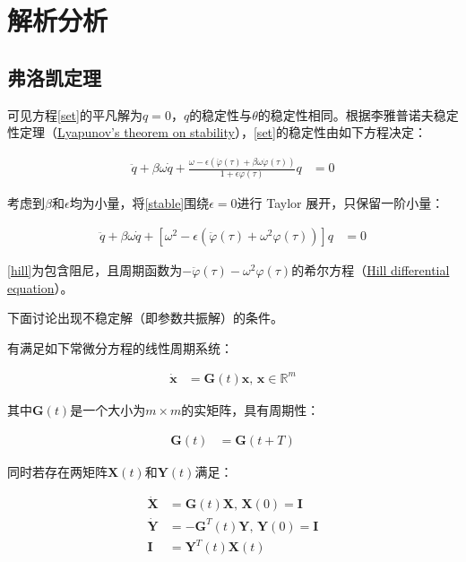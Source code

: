\section{解析分析}

\subsection{弗洛凯定理}

可见方程\eqref{set}的平凡解为$q=0$，$q$的稳定性与$\theta$的稳定性相同。根据李雅普诺夫稳定性定理（\href{https://en.wikipedia.org/wiki/Lyapunov_stability}{Lyapunov's theorem on stability}）\cite{belyakov_nonlinear_2009}，\eqref{set}的稳定性由如下方程决定：

\begin{align}
    \ddot{q}+\beta\omega\dot{q}+\frac{\omega-\epsilon(\ddot{\varphi}(\tau)+\beta\omega\dot{\varphi}(\tau))}{1+\epsilon\varphi(\tau)}q &= 0 \label{stable}
\end{align}

考虑到$\beta$和$\epsilon$均为小量，将\eqref{stable}围绕$\epsilon=0$进行 Taylor 展开，只保留一阶小量：

\begin{align}
    \ddot{q}+\beta\omega\dot{q}+\left[\omega^{2}-\epsilon\left(\ddot{\varphi}(\tau)+\omega^{2}\varphi(\tau)\right)\right]q &=0 \label{hill}
\end{align}

\eqref{hill}为包含阻尼，且周期函数为$-\ddot{\varphi}(\tau)-\omega^{2}\varphi(\tau)$的希尔方程（\href{https://en.wikipedia.org/wiki/Hill_differential_equation}{Hill differential equation}）。

下面讨论\label{hill}出现不稳定解（即参数共振解）的条件。

有满足如下常微分方程的线性周期系统：

\begin{align}
    \dot{\mathbf{x}} &= \mathbf{G}(t)\mathbf{x},\,\mathbf{x}\in\mathbb{R}^{m} \label{sys}
\end{align}

其中$\mathbf{G}(t)$是一个大小为$m\times m$的实矩阵，具有周期性：

\begin{align}
    \mathbf{G}(t) &= \mathbf{G}(t+T)
\end{align}

同时若存在两矩阵$\mathbf{X}(t)$和$\mathbf{Y}(t)$满足：

\begin{align}
    \dot{\mathbf{X}} &= \mathbf{G}(t)\mathbf{X},\,\mathbf{X}(0)=\mathbf{I} \label{x} \\ 
    \dot{\mathbf{Y}} &= -\mathbf{G}^{T}(t)\mathbf{Y},\,\mathbf{Y}(0)=\mathbf{I} \label{y} \\
    \mathbf{I} &= \mathbf{Y}^{T}(t)\mathbf{X}(t) \label{xy}
\end{align}

